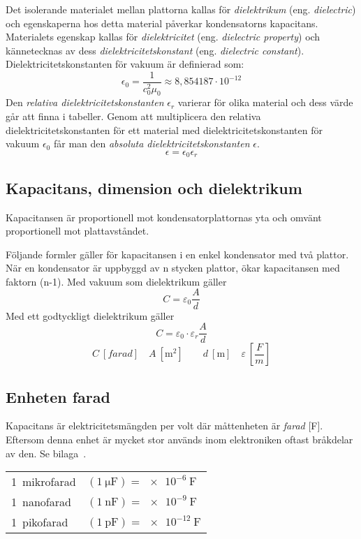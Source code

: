 Det isolerande materialet mellan plattorna kallas för \emph{dielektrikum}
(eng. \emph{dielectric}) och egenskaperna hos detta material påverkar
kondensatorns kapacitans.
Materialets egenskap kallas för \emph{dielektricitet}
(eng. \emph{dielectric property}) och kännetecknas av dess
\emph{dielektricitetskonstant} (eng. \emph{dielectric constant}).
Dielektricitetskonstanten för vakuum är definierad som:
\[\epsilon_0 = \dfrac{1}{c_0^2\mu_0} \approx 8,854187 \cdot 10^{-12}\]
Den \emph{relativa dielektricitetskonstanten} \(\epsilon_r\) varierar för olika
material och dess värde går att finna i tabeller.
Genom att multiplicera den relativa dielektricitetskonstanten för ett material
med dielektricitetskonstanten för vakuum \(\epsilon_0\) får man den
\emph{absoluta dielektricitetskonstanten} \(\epsilon\).
\[\epsilon = \epsilon_0\epsilon_r\]


\subsection{Kapacitans, dimension och dielektrikum}

Kapacitansen är proportionell mot kondensatorplattornas yta och omvänt 
proportionell mot plattavståndet.

Följande formler gäller för kapacitansen i en enkel kondensator med två
plattor. När en kondensator är uppbyggd av n stycken plattor, ökar kapacitansen
med faktorn (n-1).
Med vakuum som dielektrikum gäller
\[C = \varepsilon _0 \dfrac{A}{d}\]
Med ett godtyckligt dielektrikum gäller
\[C = \varepsilon _0 \cdot \varepsilon _r \frac{A}{d}\]
\[C\ [\textit{farad}]\quad A\ [\unit{\metre\squared}]\qquad d\ [\unit{\metre}]\quad \varepsilon\ [\dfrac{F}{m}]\]

\subsection{Enheten farad}

Kapacitans är elektricitetsmängden per volt där måttenheten är \emph{farad} [F].
Eftersom denna enhet är mycket stor används inom elektroniken oftast bråkdelar
av den.
Se bilaga~.

\begin{center}
\begin{tabular}{ll}
1~mikrofarad & \((\qty{1}{\micro\farad}) = \qty{e-6}{\farad}\) \\
1~nanofarad & \((\qty{1}{\nano\farad}) = \qty{e-9}{\farad}\) \\
1~pikofarad & \((\qty{1}{\pico\farad}) = \qty{e-12}{\farad}\) \\
\end{tabular}
\end{center}

